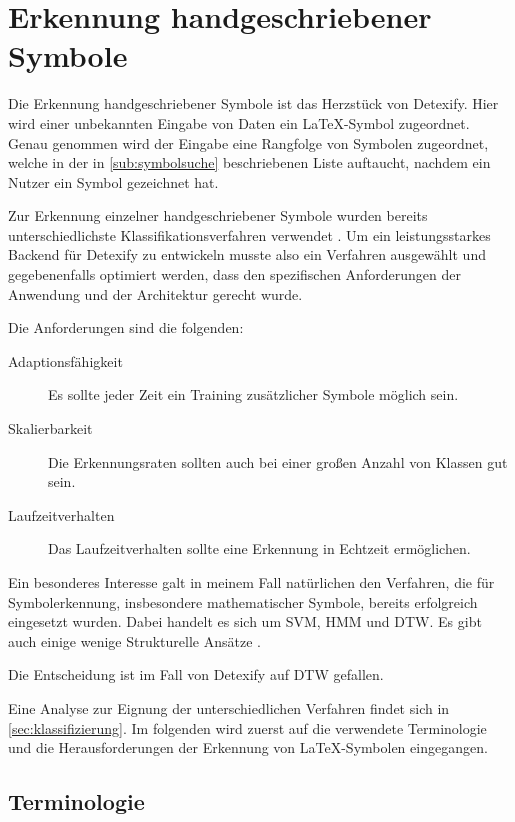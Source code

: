 \chapter{Erkennung handgeschriebener Symbole} %
\label{cha:erkennung_handgeschriebener_symbole}

Die Erkennung handgeschriebener Symbole ist das Herzstück von Detexify. Hier wird einer unbekannten Eingabe von Daten ein \LaTeX-Symbol zugeordnet. Genau genommen wird der Eingabe eine Rangfolge von Symbolen zugeordnet, welche in der in \ref{sub:symbolsuche} beschriebenen Liste auftaucht, nachdem ein Nutzer ein Symbol gezeichnet hat.

Zur Erkennung einzelner handgeschriebener Symbole wurden bereits unterschiedlichste Klassifikationsverfahren verwendet \cite{Plamondon:2000p10303}. Um ein leistungsstarkes Backend für Detexify zu entwickeln musste also ein Verfahren ausgewählt und gegebenenfalls optimiert werden, dass den spezifischen Anforderungen der Anwendung und der Architektur gerecht wurde.

Die Anforderungen sind die folgenden:

\begin{description}
  \item[Adaptionsfähigkeit] Es sollte jeder Zeit ein Training zusätzlicher Symbole möglich sein.
  \item[Skalierbarkeit] Die Erkennungsraten sollten auch bei einer großen Anzahl von Klassen gut sein.
  \item[Laufzeitverhalten] Das Laufzeitverhalten sollte eine Erkennung in Echtzeit ermöglichen.
\end{description}

Ein besonderes Interesse galt in meinem Fall natürlichen den Verfahren, die für Symbolerkennung, insbesondere mathematischer Symbole, bereits erfolgreich eingesetzt wurden. Dabei handelt es sich um \ac{SVM}, \ac{HMM} und \ac{DTW}. Es gibt auch einige wenige Strukturelle Ansätze \cite{Genoe:2006p10601}.

Die Entscheidung ist im Fall von Detexify auf \ac{DTW} gefallen.

Eine Analyse zur Eignung der unterschiedlichen Verfahren findet sich in \ref{sec:klassifizierung}. Im folgenden wird zuerst auf die verwendete Terminologie und die Herausforderungen der Erkennung von \LaTeX-Symbolen eingegangen.

\section{Terminologie} %
\label{sec:terminologie}

